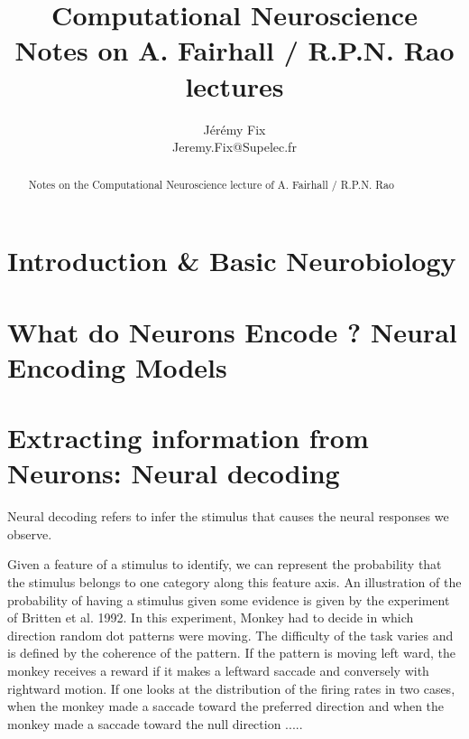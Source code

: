 \documentclass[10pt,a4paper]{article}
\title{Computational Neuroscience \\ 
		\large \vspace*{-10pt} Notes on A. Fairhall / R.P.N. Rao lectures\vspace*{10pt}}
\author{%
	Jérémy Fix \\
	Jeremy.Fix@Supelec.fr \\
	\vspace{20pt}
	}
\makeatletter
\def\printtitle{%
    {\color{bl} \centering \huge \sc \textbf{\@title}\par}}		%
\def\printauthor{%
    {\centering \small \@author}}				%
\makeatother
\begin{document}
\printtitle 

\printauthor

\begin{abstract}
Notes on the Computational Neuroscience lecture of A. Fairhall / R.P.N. Rao
\end{abstract}

\tableofcontents

\pagebreak

\section{Introduction \& Basic Neurobiology}

\section{What do Neurons Encode ? Neural Encoding Models}

\section{Extracting information from Neurons: Neural decoding}

Neural decoding refers to infer the stimulus that causes the neural responses we observe.

Given a feature of a stimulus to identify, we can represent the probability that the stimulus belongs to one category along this feature axis. An illustration of the probability of having a stimulus given some evidence is given by the experiment of Britten et al. 1992. In this experiment, Monkey had to decide in which direction random dot patterns were moving. The difficulty of the task varies and is defined by the coherence of the pattern. If the pattern is moving left ward, the monkey receives a reward if it makes a leftward saccade and conversely with rightward motion. If one looks at the distribution of the firing rates in two cases, when the monkey made a saccade toward the preferred direction and when the monkey made a saccade toward the null direction .....
\end{document}
